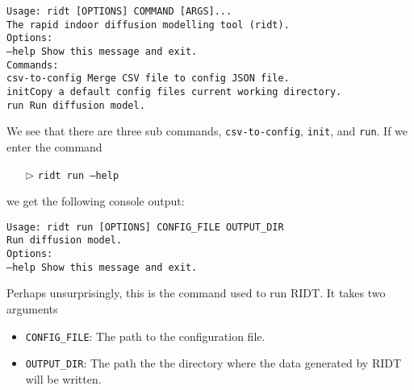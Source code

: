 \documentclass[]{article}
\def\code#1{\texttt{#1}}
\def\HS{\hspace{\fontdimen2\font}}
\begin{document}
\begin{addmargin}[1.5em]{1em}
\begin{tcolorbox}[enhanced,width=6in,fontupper=\bfseries,drop shadow
southwest,sharp corners, before upper={\parindent15pt}]
\noindent\code{Usage: ridt [OPTIONS] COMMAND [ARGS]...}\\

\indent\code{The rapid indoor diffusion modelling tool (ridt).}\\

\noindent\code{Options:}\\
\indent\code{--help  Show this message and exit.}\\

\noindent\code{Commands:}\\
\indent\code{csv-to-config \HS\HS\HS\HS Merge CSV file to config JSON file.}\\
\indent\code{init\HS\HS\HS\HS\HS\HS\HS\HS\HS\HS\HS\HS\HS\HS Copy a default 
config files current working directory.}\\
\indent\code{run \HS\HS\HS\HS\HS\HS\HS\HS\HS\HS\HS\HS\HS\HS Run diffusion model.}
\end{tcolorbox}
\end{addmargin}
\medskip

\noindent We see that there are three sub commands, \code{csv-to-config},
\code{init}, and \code{run}. If we enter the command 

\begin{itemize}
    \item[$\triangleright$] \code{ridt run --help}
\end{itemize}
we get the following console output:\\

\begin{addmargin}[1.5em]{1em}
\begin{tcolorbox}[enhanced,width=6in,fontupper=\bfseries,drop shadow
southwest,sharp corners, before upper={\parindent15pt}]
\noindent\code{Usage: ridt run [OPTIONS] CONFIG\_FILE OUTPUT\_DIR}\\

\indent\code{Run diffusion model.}\\

\noindent\code{Options:}\\
\indent\code{--help  Show this message and exit.}
\end{tcolorbox}
\end{addmargin}
\medskip

\noindent Perhaps unsurprisingly, this is the command used to run RIDT. It takes
two arguments
\begin{itemize}
    \item \code{CONFIG\_FILE}: The path to the configuration file.
    \item \code{OUTPUT\_DIR}: The path the the directory where the data
    generated by RIDT will be written.
\end{itemize}
\end{document}
